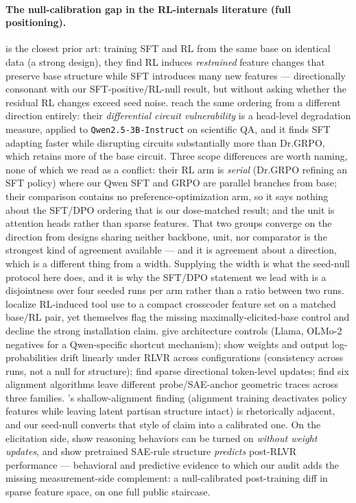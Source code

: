 \documentclass{article}
\begin{document}
\paragraph{The null-calibration gap in the RL-internals literature (full positioning).} \citet{shi2026rl_generalize} is the closest prior art: training SFT and RL from the same base on identical data (a strong design), they find RL induces \emph{restrained} feature changes that preserve base structure while SFT introduces many new features --- directionally consonant with our SFT-positive/RL-null result, but without asking whether the residual RL changes exceed seed noise. \citet{rojasnunez2026forgetting} reach the same ordering from a different direction entirely: their \emph{differential circuit vulnerability} is a head-level degradation measure, applied to \texttt{Qwen2.5-3B-Instruct} on scientific QA, and it finds SFT adapting faster while disrupting circuits substantially more than Dr.GRPO, which retains more of the base circuit. Three scope differences are worth naming, none of which we read as a conflict: their RL arm is \emph{serial} (Dr.GRPO refining an SFT policy) where our Qwen SFT and GRPO are parallel branches from base; their comparison contains no preference-optimization arm, so it says nothing about the SFT/DPO ordering that is our dose-matched result; and the unit is attention heads rather than sparse features. That two groups converge on the direction from designs sharing neither backbone, unit, nor comparator is the strongest kind of agreement available --- and it is agreement about a direction, which is a different thing from a width. Supplying the width is what the seed-null protocol here does, and it is why the SFT/DPO statement we lead with is a disjointness over four seeded runs per arm rather than a ratio between two runs. \citet{crosscoder_tooluse2026} localize RL-induced tool use to a compact crosscoder feature set on a matched base/RL pair, yet themselves flag the missing maximally-elicited-base control and decline the strong installation claim. \citet{spurious_rewards_paradox2026} give architecture controls (Llama, OLMo-2 negatives for a Qwen-specific shortcut mechanism); \citet{linear_dynamics_rlvr2026} show weights and output log-probabilities drift linearly under RLVR across configurations (consistency across runs, not a null for structure); \citet{rlvr_direction2026} find sparse directional token-level updates; \citet{sinha2026mechanistic} find six alignment algorithms leave different probe/SAE-anchor geometric traces across three families. \citet{neutral_mask2026}'s shallow-alignment finding (alignment training deactivates policy features while leaving latent partisan structure intact) is rhetorically adjacent, and our seed-null converts that style of claim into a calibrated one. On the elicitation side, \citet{venhoff2026base_reason,activation_control_cot2025,thinklogit2025} show reasoning behaviors can be turned on \emph{without weight updates}, and \citet{sal2025} show pretrained SAE-rule structure \emph{predicts} post-RLVR performance --- behavioral and predictive evidence to which our audit adds the missing measurement-side complement: a null-calibrated post-training diff in sparse feature space, on one full public staircase. 
\end{document}
